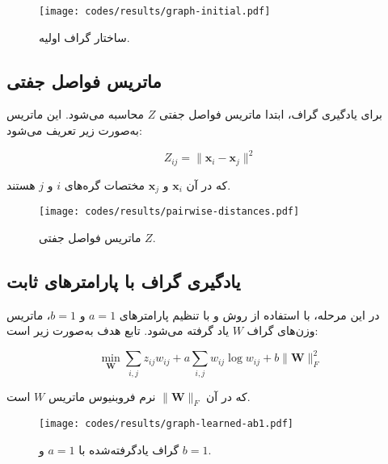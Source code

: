 \documentclass[10pt,twocolumn,a4paper]{article}
\begin{document}
	\begin{latin}
		
	\end{latin}
	
	\begin{figure}[H]
		\centering
		\texttt{[image: codes/results/graph-initial.pdf]}
		\caption{ساختار گراف اولیه.}
		\label{fig:graph-initial}
	\end{figure}
	
	\subsection{ماتریس فواصل جفتی}
	برای یادگیری گراف، ابتدا ماتریس فواصل جفتی \( Z \) محاسبه می‌شود. این ماتریس به‌صورت زیر تعریف می‌شود:
	
	\[
	Z_{ij} = \|\mathbf{x}_i - \mathbf{x}_j\|^2
	\]
	
	که در آن \( \mathbf{x}_i \) و \( \mathbf{x}_j \) مختصات گره‌های \( i \) و \( j \) هستند.
	
	\begin{latin}
		
	\end{latin}
	
	
	\begin{figure}[H]
		\centering
		\texttt{[image: codes/results/pairwise-distances.pdf]}
		\caption{ماتریس فواصل جفتی \( Z \).}
		\label{fig:pairwise-distances}
	\end{figure}
	
	\subsection{یادگیری گراف با پارامترهای ثابت}
	در این مرحله، با استفاده از روش \cite{Kalofolias2016} و با تنظیم پارامترهای \( a = 1 \) و \( b = 1 \)، ماتریس وزن‌های گراف \( W \) یاد گرفته می‌شود. تابع هدف به‌صورت زیر است:
	
	\[
	\min_{\bm{W}} \sum_{i,j} z_{ij} w_{ij} + a \sum_{i,j} {w}_{ij} \log {w}_{ij} + b \|\bm{W}\|_F^2
	\]
	
	که در آن
	 \( \|\bm{W}\|_F \)
	 نرم فروبنیوس ماتریس \( W \) است.
	
	\begin{latin}
		
	\end{latin}
	
	\begin{figure}[H]
		\centering
		\texttt{[image: codes/results/graph-learned-ab1.pdf]}
		\caption{گراف یادگرفته‌شده با \( a = 1 \) و \( b = 1 \).}
		\label{fig:graph-learned-ab1}
	\end{figure}
	
\end{document}
